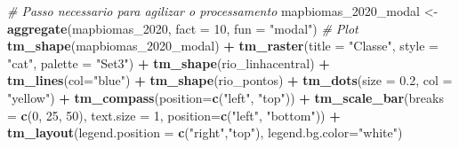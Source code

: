 \documentclass[
]{article}
\newenvironment{Shaded}{\begin{snugshade}}{\end{snugshade}}
\newcommand{\AttributeTok}[1]{\textcolor[rgb]{0.13,0.29,0.53}{#1}}
\newcommand{\CommentTok}[1]{\textcolor[rgb]{0.56,0.35,0.01}{\textit{#1}}}
\newcommand{\DecValTok}[1]{\textcolor[rgb]{0.00,0.00,0.81}{#1}}
\newcommand{\FloatTok}[1]{\textcolor[rgb]{0.00,0.00,0.81}{#1}}
\newcommand{\FunctionTok}[1]{\textcolor[rgb]{0.13,0.29,0.53}{\textbf{#1}}}
\newcommand{\NormalTok}[1]{#1}
\newcommand{\OtherTok}[1]{\textcolor[rgb]{0.56,0.35,0.01}{#1}}
\newcommand{\SpecialCharTok}[1]{\textcolor[rgb]{0.81,0.36,0.00}{\textbf{#1}}}
\newcommand{\StringTok}[1]{\textcolor[rgb]{0.31,0.60,0.02}{#1}}
\begin{document}
\begin{Shaded}
\begin{Highlighting}[]
\CommentTok{\# Passo necessario para agilizar o processamento}
\NormalTok{mapbiomas\_2020\_modal }\OtherTok{\textless{}{-}} \FunctionTok{aggregate}\NormalTok{(mapbiomas\_2020, }
                                  \AttributeTok{fact =} \DecValTok{10}\NormalTok{, }
                                  \AttributeTok{fun =} \StringTok{"modal"}\NormalTok{)}
\CommentTok{\# Plot}
\FunctionTok{tm\_shape}\NormalTok{(mapbiomas\_2020\_modal) }\SpecialCharTok{+}
  \FunctionTok{tm\_raster}\NormalTok{(}\AttributeTok{title =} \StringTok{"Classe"}\NormalTok{, }\AttributeTok{style =} \StringTok{"cat"}\NormalTok{, }\AttributeTok{palette =} \StringTok{"Set3"}\NormalTok{) }\SpecialCharTok{+} 
\FunctionTok{tm\_shape}\NormalTok{(rio\_linhacentral) }\SpecialCharTok{+} 
  \FunctionTok{tm\_lines}\NormalTok{(}\AttributeTok{col=}\StringTok{"blue"}\NormalTok{) }\SpecialCharTok{+} 
\FunctionTok{tm\_shape}\NormalTok{(rio\_pontos) }\SpecialCharTok{+} 
  \FunctionTok{tm\_dots}\NormalTok{(}\AttributeTok{size =} \FloatTok{0.2}\NormalTok{, }\AttributeTok{col =} \StringTok{"yellow"}\NormalTok{) }\SpecialCharTok{+} 
\FunctionTok{tm\_compass}\NormalTok{(}\AttributeTok{position=}\FunctionTok{c}\NormalTok{(}\StringTok{"left"}\NormalTok{, }\StringTok{"top"}\NormalTok{)) }\SpecialCharTok{+}
\FunctionTok{tm\_scale\_bar}\NormalTok{(}\AttributeTok{breaks =} \FunctionTok{c}\NormalTok{(}\DecValTok{0}\NormalTok{, }\DecValTok{25}\NormalTok{, }\DecValTok{50}\NormalTok{), }\AttributeTok{text.size =} \DecValTok{1}\NormalTok{, }
             \AttributeTok{position=}\FunctionTok{c}\NormalTok{(}\StringTok{"left"}\NormalTok{, }\StringTok{"bottom"}\NormalTok{)) }\SpecialCharTok{+}
\FunctionTok{tm\_layout}\NormalTok{(}\AttributeTok{legend.position =} \FunctionTok{c}\NormalTok{(}\StringTok{"right"}\NormalTok{,}\StringTok{"top"}\NormalTok{), }\AttributeTok{legend.bg.color=}\StringTok{"white"}\NormalTok{)}
\end{Highlighting}
\end{Shaded}
\end{document}
